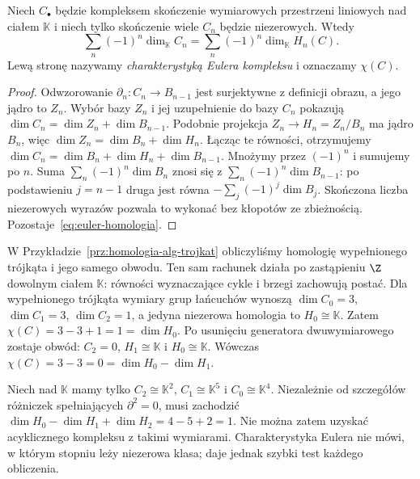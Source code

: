 \begin{twierdzenie}
\label{thm:euler-homologia}
Niech $C_\bullet$ będzie kompleksem
skończenie wymiarowych przestrzeni
liniowych nad ciałem $\mathbb K$
i niech tylko skończenie wiele $C_n$
będzie niezerowych. Wtedy
\begin{equation}\label{eq:euler-homologia}
 \sum_n(-1)^n\dim_{\mathbb K}C_n
 =\sum_n(-1)^n\dim_{\mathbb K}H_n(C).
\end{equation}
Lewą stronę nazywamy \emph{charakterystyką
Eulera kompleksu} i oznaczamy $\chi(C)$.
\end{twierdzenie}
\begin{proof}
Odwzorowanie $\partial_n:C_n\to B_{n-1}$ jest
surjektywne z definicji obrazu,
a jego jądro to $Z_n$.
Wybór bazy $Z_n$ i jej uzupełnienie
do bazy $C_n$ pokazują
$\dim C_n=\dim Z_n+\dim B_{n-1}$.
Podobnie projekcja $Z_n\to H_n=Z_n/B_n$
ma jądro $B_n$, więc
$\dim Z_n=\dim B_n+\dim H_n$.
Łącząc te równości, otrzymujemy
$\dim C_n=\dim B_n+\dim H_n+\dim B_{n-1}$.
Mnożymy przez $(-1)^n$ i sumujemy
po $n$. Suma
$\sum_n(-1)^n\dim B_n$
znosi się z
$\sum_n(-1)^n\dim B_{n-1}$:
po podstawieniu $j=n-1$
druga jest równa
$-\sum_j(-1)^j\dim B_j$.
Skończona liczba niezerowych
wyrazów pozwala to wykonać bez
kłopotów ze zbieżnością.
Pozostaje~\eqref{eq:euler-homologia}.
\end{proof}

\begin{przyklad}
W Przykładzie~\ref{prz:homologia-alg-trojkat} obliczyliśmy
homologię wypełnionego trójkąta i jego samego obwodu.
Ten sam rachunek działa po zastąpieniu $\Z$ dowolnym
ciałem $\mathbb K$: równości wyznaczające cykle i brzegi
zachowują postać. Dla wypełnionego trójkąta wymiary grup
łańcuchów wynoszą $\dim C_0=3$, $\dim C_1=3$,
$\dim C_2=1$, a jedyna niezerowa homologia to
$H_0\cong\mathbb K$. Zatem $\chi(C)=3-3+1=1=\dim H_0$.
Po usunięciu generatora dwuwymiarowego zostaje obwód:
$C_2=0$, $H_1\cong\mathbb K$ i $H_0\cong\mathbb K$.
Wówczas $\chi(C)=3-3=0=\dim H_0-\dim H_1$.
\end{przyklad}

\begin{przyklad}
Niech nad $\mathbb K$ mamy tylko
$C_2\cong\mathbb K^2$, $C_1\cong\mathbb K^5$
i $C_0\cong\mathbb K^4$.
Niezależnie od szczegółów różniczek
spełniających $\partial^2=0$, musi zachodzić
$\dim H_0-\dim H_1+\dim H_2=4-5+2=1$.
Nie można zatem uzyskać
acyklicznego kompleksu z takimi
wymiarami. Charakterystyka Eulera
nie mówi, w którym stopniu leży
niezerowa klasa; daje jednak
szybki test każdego obliczenia.
\end{przyklad}

